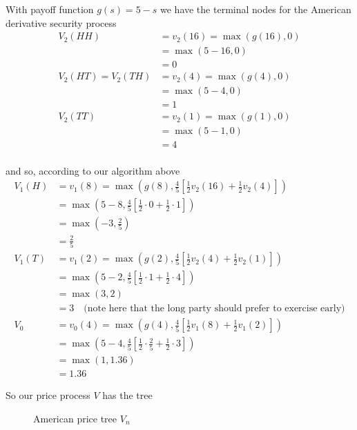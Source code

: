 \documentclass[12pt]{article}
\newlength\tindent
\renewcommand{\indent}{\hspace*{\tindent}}
\begin{document}
\indent With payoff function $g(s) = 5 - s$ we have the terminal nodes for the American derivative security process
\begin{align*}
	V_2(HH) &= v_2(16) = \max(g(16),0) \\
	&= \max(5 - 16, 0) \\
	&= 0 \\
	V_2(HT) = V_2(TH) &= v_2(4) = \max(g(4),0) \\
	&= \max(5 - 4, 0) \\
	&= 1 \\
	V_2(TT) &= v_2(1) = \max(g(1),0) \\
	&= \max(5 - 1, 0) \\
	&= 4 \\
\end{align*}

and so, according to our algorithm above
\begin{align*}
	V_1(H) &= v_1(8) = \max \left( g(8), \frac{4}{5}\left[\frac{1}{2}v_2(16) + \frac{1}{2}v_2(4)\right] \right) \\
	&= \max \left(5 - 8, \frac{4}{5}\left[\frac{1}{2}\cdot 0 + \frac{1}{2}\cdot 1\right] \right) \\ 
	&= \max \left(-3, \frac{2}{5}\right) \\
	&= \frac{2}{5} \\
	V_1(T) &= v_1(2) = \max \left( g(2), \frac{4}{5}\left[\frac{1}{2}v_2(4) + \frac{1}{2}v_2(1)\right] \right) \\
	&= \max \left(5 - 2, \frac{4}{5}\left[\frac{1}{2}\cdot 1 + \frac{1}{2}\cdot 4\right] \right)  \\
	&= \max (3, 2) \\
	&= 3 \quad \text{(note here that the long party should prefer to exercise early)} \\
	V_0 &= v_0(4) = \max \left( g(4), \frac{4}{5}\left[\frac{1}{2}v_1(8) + \frac{1}{2}v_1(2)\right] \right) \\
	&= \max \left(5 - 4, \frac{4}{5}\left[\frac{1}{2}\cdot \frac{2}{5} + \frac{1}{2}\cdot 3 \right] \right)  \\
	&= \max \left( 1, 1.36 \right) \\
	&= 1.36
\end{align*} 

So our price process $V$ has the tree
\begin{figure}[H]
\centering
{}
\caption{American price tree $V_n$}
\end{figure}
\end{document}
